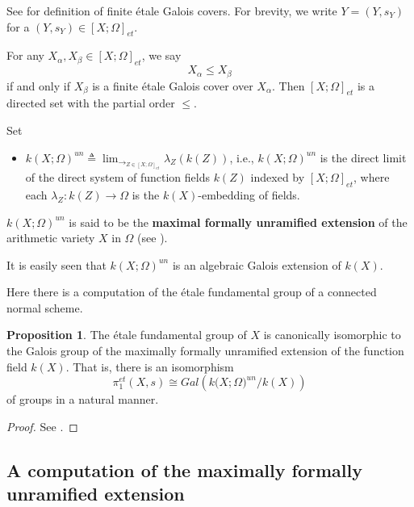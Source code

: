 \documentclass{amsart}
\theoremstyle{definition}
\newtheorem{proposition}[theorem]{Proposition}
\numberwithin{equation}{section}
\begin{document}
See \cite{f-k,sga1,sz} for definition of finite \'{e}tale Galois covers. For brevity, we write $Y=(Y,s_{Y})$ for a $(Y,s_{Y})\in \left[ X;\Omega \right] _{et}$.

For any $X_{\alpha},X_{\beta}\in \left[X; \Omega \right]_{et}$, we say
\begin{equation*}
X_{\alpha}\leq X_{\beta}
\end{equation*}
if and only if $X_{\beta}$ is a finite \'{e}tale Galois cover over $X_{\alpha}.$ Then $\left[X; \Omega \right]_{et} $ is a directed set with the
partial order $\leq$.

Set

\begin{itemize}
\item $k(X; \Omega)^{un}\triangleq {{\lim}_{\rightarrow_{Z\in {\left[X;
\Omega \right]_{et}}}}}{\lambda_{Z}(k(Z))} $, i.e., $k(X; \Omega)^{un}$ is
the direct limit of the direct system of function fields $k(Z)$ indexed by $\left[X; \Omega \right]_{et}$, where each $\lambda_{Z}:k(Z)\to \Omega$ is
the $k(X)$-embedding of fields.
\end{itemize}

$k(X; \Omega)^{un}$ is said to be the \textbf{maximal formally unramified extension} of the arithmetic variety $X$ in $\Omega$ (see \cite{an2,an4}).

It is easily seen that $k(X; \Omega)^{un}$ is an algebraic Galois extension of $k(X)$.


Here there is a computation of the \'{e}tale fundamental group of a connected normal
scheme.

\begin{proposition}
The \'{e}tale fundamental group of $X$ is canonically isomorphic to the Galois group of the maximally formally unramified extension of the function field $k(X)$. That is, there is an isomorphism
\begin{equation*}
\pi _{1}^{et}\left( X,s\right) \cong Gal\left( {k(X; \Omega})^{un}/k\left(
X\right) \right)
\end{equation*}
of groups in a natural manner.
\end{proposition}

\begin{proof}
See \cite{an2,an4,f-k,sga1,mln,sz}.
\end{proof}


\subsection{A computation of the maximally formally unramified extension}
\end{document}
